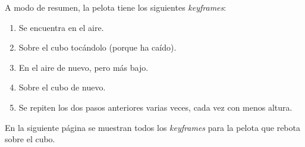 \documentclass{article}
\begin{document}
\bigskip

A modo de resumen, la pelota tiene los siguientes \textit{keyframes}:

\begin{enumerate}
    \item Se encuentra en el aire.
    \item Sobre el cubo tocándolo (porque ha caído).
    \item En el aire de nuevo, pero más bajo.
    \item Sobre el cubo de nuevo.
    \item Se repiten los dos pasos anteriores varias veces, cada vez con menos altura.
\end{enumerate}

En la siguiente página se muestran todos los \textit{keyframes} para la pelota que rebota sobre el cubo.
\end{document}
